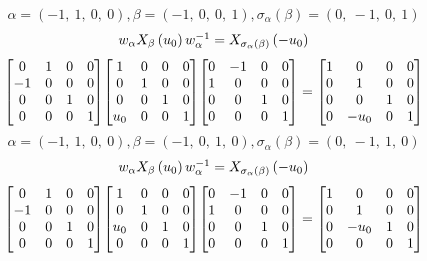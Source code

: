 \documentclass[11pt]{article}
\theoremstyle{definition}
\begin{document}
\[
\alpha = \left( -1, \  1, \  0, \  0\right), \beta = \left( -1, \  0, \  0, \  1\right), \sigma_{\alpha}(\beta) = \left( 0, \  -1, \  0, \  1\right)
\]
\[
\scaletoalign{\textwidth}{w_{\alpha} X_{\beta}\left(u_{0}\right) w_{\alpha}^{-1} = X_{\sigma_{\alpha}\left(\beta\right)}\left(- u_{0}\right)}
\]
\[
\scaletoalign{\textwidth}{{\left[\begin{matrix}0 & 1 & 0 & 0\\-1 & 0 & 0 & 0\\0 & 0 & 1 & 0\\0 & 0 & 0 & 1\end{matrix}\right]} {\left[\begin{matrix}1 & 0 & 0 & 0\\0 & 1 & 0 & 0\\0 & 0 & 1 & 0\\u_{0} & 0 & 0 & 1\end{matrix}\right]} {\left[\begin{matrix}0 & -1 & 0 & 0\\1 & 0 & 0 & 0\\0 & 0 & 1 & 0\\0 & 0 & 0 & 1\end{matrix}\right]} = {\left[\begin{matrix}1 & 0 & 0 & 0\\0 & 1 & 0 & 0\\0 & 0 & 1 & 0\\0 & - u_{0} & 0 & 1\end{matrix}\right]}}
\]
\[
\alpha = \left( -1, \  1, \  0, \  0\right), \beta = \left( -1, \  0, \  1, \  0\right), \sigma_{\alpha}(\beta) = \left( 0, \  -1, \  1, \  0\right)
\]
\[
\scaletoalign{\textwidth}{w_{\alpha} X_{\beta}\left(u_{0}\right) w_{\alpha}^{-1} = X_{\sigma_{\alpha}\left(\beta\right)}\left(- u_{0}\right)}
\]
\[
\scaletoalign{\textwidth}{{\left[\begin{matrix}0 & 1 & 0 & 0\\-1 & 0 & 0 & 0\\0 & 0 & 1 & 0\\0 & 0 & 0 & 1\end{matrix}\right]} {\left[\begin{matrix}1 & 0 & 0 & 0\\0 & 1 & 0 & 0\\u_{0} & 0 & 1 & 0\\0 & 0 & 0 & 1\end{matrix}\right]} {\left[\begin{matrix}0 & -1 & 0 & 0\\1 & 0 & 0 & 0\\0 & 0 & 1 & 0\\0 & 0 & 0 & 1\end{matrix}\right]} = {\left[\begin{matrix}1 & 0 & 0 & 0\\0 & 1 & 0 & 0\\0 & - u_{0} & 1 & 0\\0 & 0 & 0 & 1\end{matrix}\right]}}
\]
\end{document}
